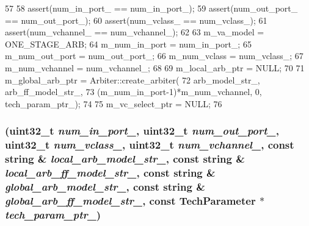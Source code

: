 \begin{DoxyCode}
57 {
58     assert(num_in_port_ == num_in_port_);
59     assert(num_out_port_ == num_out_port_);
60     assert(num_vclass_ == num_vclass_);
61     assert(num_vchannel_ == num_vchannel_);
62 
63     m_va_model = ONE_STAGE_ARB;
64     m_num_in_port = num_in_port_;
65     m_num_out_port = num_out_port_;
66     m_num_vclass = num_vclass_;
67     m_num_vchannel = num_vchannel_;
68 
69     m_local_arb_ptr = NULL;
70 
71     m_global_arb_ptr = Arbiter::create_arbiter(
72             arb_model_str_, arb_ff_model_str_,
73             (m_num_in_port-1)*m_num_vchannel, 0, tech_param_ptr_);
74 
75     m_vc_select_ptr = NULL;
76 }
\end{DoxyCode}
\hypertarget{classVCAllocator_a5b05efc72373929d96a89a3fd24feb6e}{
\subsubsection[{VCAllocator}]{ ({\bf uint32\_\-t} {\em num\_\-in\_\-port\_\-}, \/  {\bf uint32\_\-t} {\em num\_\-out\_\-port\_\-}, \/  {\bf uint32\_\-t} {\em num\_\-vclass\_\-}, \/  {\bf uint32\_\-t} {\em num\_\-vchannel\_\-}, \/  const string \& {\em local\_\-arb\_\-model\_\-str\_\-}, \/  const string \& {\em local\_\-arb\_\-ff\_\-model\_\-str\_\-}, \/  const string \& {\em global\_\-arb\_\-model\_\-str\_\-}, \/  const string \& {\em global\_\-arb\_\-ff\_\-model\_\-str\_\-}, \/  const {\bf TechParameter} $\ast$ {\em tech\_\-param\_\-ptr\_\-})}}
\label{classVCAllocator_a5b05efc72373929d96a89a3fd24feb6e}



